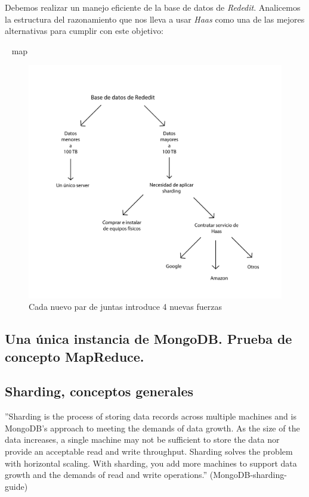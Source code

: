 Debemos realizar un manejo eficiente de la base de datos de \emph{Rededit}. Analicemos la estructura del razonamiento que 
nos lleva a usar \emph{Haas} como una de las mejores alternativas para cumplir con este objetivo:

~
map
\begin{figure}[!h]
	\begin{center}
		  \includegraphics[keepaspectratio]{imagenes/im_1.pdf}
		  \caption{Cada nuevo par de juntas introduce 4 nuevas fuerzas}
		  \label{fig:contra1}
	\end{center}
\end{figure}
\FloatBarrier


\subsection{Una única instancia de MongoDB. Prueba de concepto MapReduce.}


\subsection{Sharding, conceptos generales}

''Sharding is the process of storing data records across multiple machines and is MongoDB’s approach to meeting the
demands of data growth. As the size of the data increases, a single machine may not be sufficient to store the data nor
provide an acceptable read and write throughput. Sharding solves the problem with horizontal scaling. With sharding,
you add more machines to support data growth and the demands of read and write operations.'' (MongoDB-sharding-guide)

